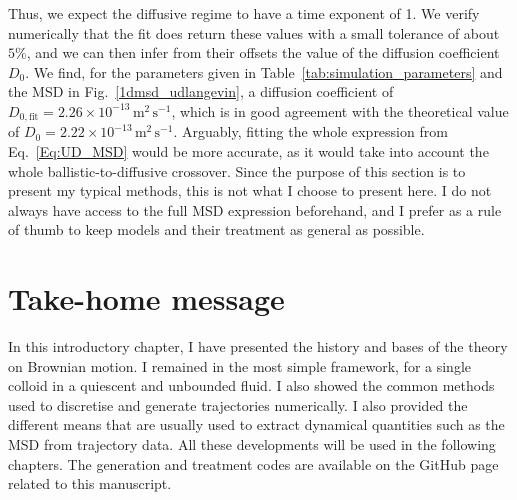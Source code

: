 Thus, we expect the diffusive regime to have a time exponent of 1. We verify numerically that the fit does return these values with a small tolerance of about $5\%$, and we can then infer from their offsets the value of the diffusion coefficient $D_0$. We find, for the parameters given in Table~\ref{tab:simulation_parameters} and the MSD in Fig.~\ref{1dmsd_udlangevin}, a diffusion coefficient of $D_{0, \text{fit}} = 2.26 \times 10^{-13}\,\mathrm{m^2\,s^{-1}}$, which is in good agreement with the theoretical value of $D_0 = 2.22 \times 10^{-13}\,\mathrm{m^2\,s^{-1}}$. Arguably, fitting the whole expression from Eq.~\ref{Eq:UD_MSD} would be more accurate, as it would take into account the whole ballistic-to-diffusive crossover. Since the purpose of this section is to present my typical methods, this is not what I choose to present here. I do not always have access to the full MSD expression beforehand, and I prefer as a rule of thumb to keep models and their treatment as general as possible. 

\section{Take-home message}
In this introductory chapter, I have presented the history and bases of the theory on Brownian motion. I remained in the most simple framework, for a single colloid in a quiescent and unbounded fluid. I also showed the common methods used to discretise and generate trajectories numerically. I also provided the different means that are usually used to extract dynamical quantities such as the MSD from trajectory data. All these developments will be used in the following chapters. The generation and treatment codes are available on the GitHub page related to this manuscript.

